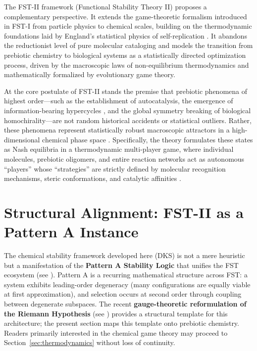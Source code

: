 \documentclass[12pt,a4paper]{article}
\theoremstyle{remark}
\begin{document}
The FST-II framework (Functional Stability Theory II) proposes a complementary perspective. It extends the game-theoretic formalism introduced in FST-I \citep{FSTI} from particle physics to chemical scales, building on the thermodynamic foundations laid by England's statistical physics of self-replication \citep{England2013}. It abandons the reductionist level of pure molecular cataloging and models the transition from prebiotic chemistry to biological systems as a statistically directed optimization process, driven by the macroscopic laws of non-equilibrium thermodynamics and mathematically formalized by evolutionary game theory.

At the core postulate of FST-II stands the premise that prebiotic phenomena of highest order---such as the establishment of autocatalysis, the emergence of information-bearing hypercycles \citep{Eigen1979}, and the global symmetry breaking of biological homochirality---are not random historical accidents or statistical outliers. Rather, these phenomena represent statistically robust macroscopic attractors in a high-dimensional chemical phase space \citep{ReplicatorEntropy}. Specifically, the theory formulates these states as Nash equilibria in a thermodynamic multi-player game, where individual molecules, prebiotic oligomers, and entire reaction networks act as autonomous ``players'' whose ``strategies'' are strictly defined by molecular recognition mechanisms, steric conformations, and catalytic affinities \citep{CGT2018,CGTMacmillan}.

\section{Structural Alignment: FST-II as a Pattern A Instance}
\label{sec:structural-alignment}

The chemical stability framework developed here (DKS) is not a mere heuristic but a manifestation of the \textbf{Pattern A Stability Logic} that unifies the FST ecosystem (see \cite{FST-Unified2026}). Pattern A is a recurring mathematical structure across FST: a system exhibits leading-order degeneracy (many configurations are equally viable at first approximation), and selection occurs at second order through coupling between degenerate subspaces. The recent \textbf{gauge-theoretic reformulation of the Riemann Hypothesis} (see \cite{GeigerRH2026c}) provides a structural template for this architecture; the present section maps this template onto prebiotic chemistry. Readers primarily interested in the chemical game theory may proceed to Section~\ref{sec:thermodynamics} without loss of continuity.
\end{document}
